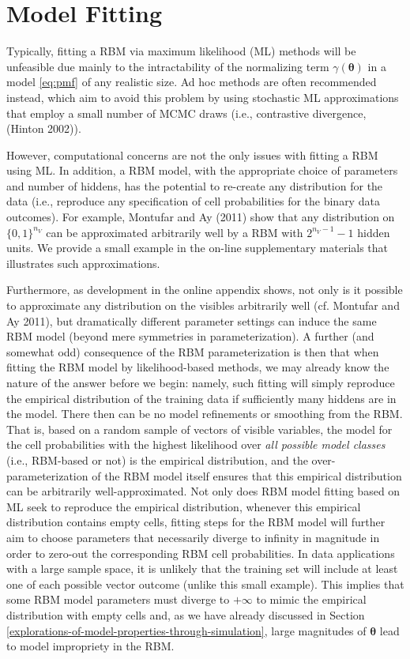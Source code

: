 \documentclass[AMS,STIX1COL]{WileyNJD-v2}
\newcommand{\nv}{{n_{\scriptscriptstyle V}}}
\begin{document}
\hypertarget{model-fitting}{%
\section{Model Fitting}\label{model-fitting}}

Typically, fitting a RBM via maximum likelihood (ML) methods will be
unfeasible due mainly to the intractability of the normalizing term
\(\gamma(\boldsymbol \theta)\) in a model \eqref{eq:pmf} of any
realistic size. Ad hoc methods are often recommended instead, which aim
to avoid this problem by using stochastic ML approximations that employ
a small number of MCMC draws (i.e., contrastive divergence, (Hinton
2002)).

However, computational concerns are not the only issues with fitting a
RBM using ML. In addition, a RBM model, with the appropriate choice of
parameters and number of hiddens, has the potential to re-create any
distribution for the data (i.e., reproduce any specification of cell
probabilities for the binary data outcomes). For example, Montufar and
Ay (2011) show that any distribution on \(\{0, 1\}^{\nv}\) can be
approximated arbitrarily well by a RBM with \(2^{\nv-1} - 1\) hidden
units. We provide a small example in the on-line supplementary materials
that illustrates such approximations.

Furthermore, as development in the online appendix shows, not only is it
possible to approximate any distribution on the visibles arbitrarily
well (cf. Montufar and Ay 2011), but dramatically different parameter
settings can induce the same RBM model (beyond mere symmetries in
parameterization). A further (and somewhat odd) consequence of the RBM
parameterization is then that when fitting the RBM model by
likelihood-based methods, we may already know the nature of the answer
before we begin: namely, such fitting will simply reproduce the
empirical distribution of the training data if sufficiently many hiddens
are in the model. There then can be no model refinements or smoothing
from the RBM. That is, based on a random sample of vectors of visible
variables, the model for the cell probabilities with the highest
likelihood over \emph{all possible model classes} (i.e., RBM-based or
not) is the empirical distribution, and the over-parameterization of the
RBM model itself ensures that this empirical distribution can be
arbitrarily well-approximated. Not only does RBM model fitting based on
ML seek to reproduce the empirical distribution, whenever this empirical
distribution contains empty cells, fitting steps for the RBM model will
further aim to choose parameters that necessarily diverge to infinity in
magnitude in order to zero-out the corresponding RBM cell probabilities.
In data applications with a large sample space, it is unlikely that the
training set will include at least one of each possible vector outcome
(unlike this small example). This implies that some RBM model parameters
must diverge to \(+\infty\) to mimic the empirical distribution with
empty cells and, as we have already discussed in Section
\ref{explorations-of-model-properties-through-simulation}, large
magnitudes of \(\boldsymbol \theta\) lead to model impropriety in the
RBM.
\end{document}
